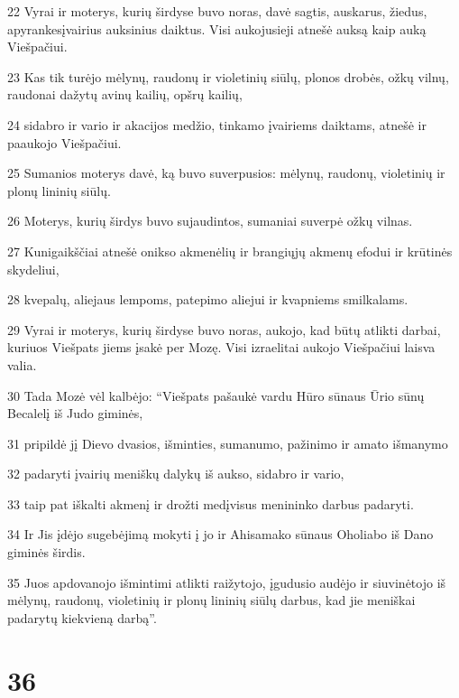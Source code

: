 \par 22 Vyrai ir moterys, kurių širdyse buvo noras, davė sagtis, auskarus, žiedus, apyrankes­įvairius auksinius daiktus. Visi aukojusieji atnešė auksą kaip auką Viešpačiui. 
\par 23 Kas tik turėjo mėlynų, raudonų ir violetinių siūlų, plonos drobės, ožkų vilnų, raudonai dažytų avinų kailių, opšrų kailių, 
\par 24 sidabro ir vario ir akacijos medžio, tinkamo įvairiems daiktams, atnešė ir paaukojo Viešpačiui. 
\par 25 Sumanios moterys davė, ką buvo suverpusios: mėlynų, raudonų, violetinių ir plonų lininių siūlų. 
\par 26 Moterys, kurių širdys buvo sujaudintos, sumaniai suverpė ožkų vilnas. 
\par 27 Kunigaikščiai atnešė onikso akmenėlių ir brangiųjų akmenų efodui ir krūtinės skydeliui, 
\par 28 kvepalų, aliejaus lempoms, patepimo aliejui ir kvapniems smilkalams. 
\par 29 Vyrai ir moterys, kurių širdyse buvo noras, aukojo, kad būtų atlikti darbai, kuriuos Viešpats jiems įsakė per Mozę. Visi izraelitai aukojo Viešpačiui laisva valia. 
\par 30 Tada Mozė vėl kalbėjo: “Viešpats pašaukė vardu Hūro sūnaus Ūrio sūnų Becalelį iš Judo giminės, 
\par 31 pripildė jį Dievo dvasios, išminties, sumanumo, pažinimo ir amato išmanymo 
\par 32 padaryti įvairių meniškų dalykų iš aukso, sidabro ir vario, 
\par 33 taip pat iškalti akmenį ir drožti medį­visus menininko darbus padaryti. 
\par 34 Ir Jis įdėjo sugebėjimą mokyti į jo ir Ahisamako sūnaus Oholiabo iš Dano giminės širdis. 
\par 35 Juos apdovanojo išmintimi atlikti raižytojo, įgudusio audėjo ir siuvinėtojo iš mėlynų, raudonų, violetinių ir plonų lininių siūlų darbus, kad jie meniškai padarytų kiekvieną darbą”.



\chapter{36}


